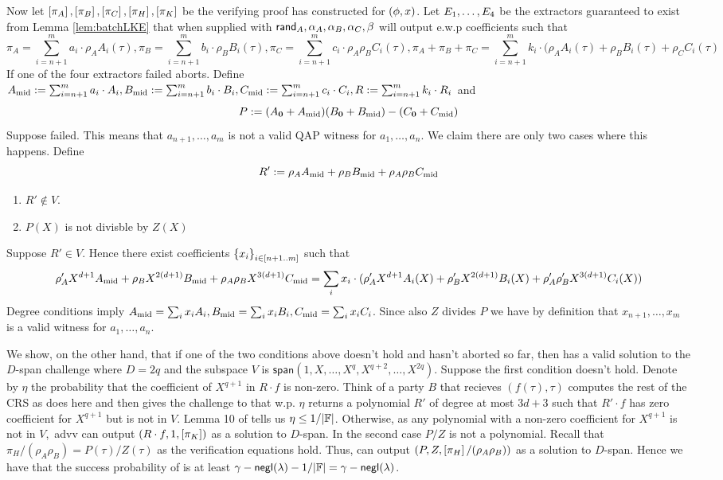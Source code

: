 \documentclass[11pt]{article}
\numberwithin{figure}{section} %
\newcommand{\set}[1]{\ensuremath{\left\{#1\right\}}\xspace}
\renewcommand{\span}{\ensuremath{\mathsf{span}}\xspace}
\begin{document}
 Now let $\left[\pi_A\right],\left[\pi_B\right],\left[\pi_C\right],\left[\pi_H\right],\left[\pi_K\right]$ be the verifying proof \adv has constructed
 for $(\phi,x)$.
 Let $E_1,\ldots,E_4$ be the extractors guaranteed to exist from Lemma \ref{lem:batchLKE}
 that when supplied with $\mathsf{rand}_{A},\alpha_A,\alpha_B,\alpha_C,\beta$ will output e.w.p \negl
 coefficients   such that
 \[\pi_A =\sum_{i= n+1}^m a_i\cdot \rho_A  A_i(\tau),\pi_B = \sum_{i= n+1}^m b_i\cdot \rho_B  B_i(\tau),
  \pi_C = \sum_{i= n+1}^m c_i\cdot \rho_A\rho_B  C_i(\tau), \pi_A+\pi_B+\pi_C = \sum_{i= n+1}^m k_i\cdot (\rho_A  A_i(\tau)+ \rho_B B_i(\tau) + \rho_C C_i(\tau)
 \]
If one of the four extractors failed \advv aborts.
Define $A_{\mathrm{mid}} := \sum_{i= n+1}^m a_i\cdot   A_i,B_{\mathrm{mid}} := \sum_{i= n+1}^m b_i\cdot B_i,
C_{\mathrm{mid}} := \sum_{i= n+1}^m c_i\cdot C_i, R:= \sum_{i= n+1}^m k_i\cdot R_i $
and 
\[P:= (A_{\mathrm{\mathbf{0}}}+A_{\mathrm{mid}})(B_{\mathrm{\mathbf{0}}}+B_{\mathrm{mid}})-(C_{\mathrm{\mathbf{0}}}+C_{\mathrm{mid}})\]
 Suppose \ext failed.
 This means that $a_{n+1},\ldots,a_m$ is not a valid QAP witness for $a_1,\ldots,a_n$.
We claim there are only two cases where this happens.
Define 
\[R':= \rho_A A_{\mathrm{mid}} + \rho_B B_{\mathrm{mid}} + \rho_A\rho_B C_{\mathrm{mid}}\]
\begin{enumerate}
 \item $R'\notin V$.
 \item $P(X)$ is not divisble by $Z(X)$
\end{enumerate}

Suppose $R'\in V$. Hence there exist coefficients $\sett{x_i}{i\in [n+1..m]}$ such that
\[\rho'_A X^{d+1} A_{\mathrm{mid}} + \rho_B X^{2(d+1)} B_{\mathrm{mid}} + \rho_A\rho_B X^{3(d+1)}C_{\mathrm{mid}} = \sum_i x_i\cdot (\rho'_A X^{d+1} A_i(X) + \rho'_BX^{2(d+1)} B_i(X) + \rho'_A\rho'_B X^{3(d+1)} C_i(X))\]
Degree conditions imply $A_{\mathrm{mid}} = \sum_i x_i A_i,B_{\mathrm{mid}} =\sum_i x_i B_i, C_{\mathrm{mid}} = \sum_i x_i C_i$.
Since also $Z$ divides $P$ we have by definition that $x_{n+1},\ldots,x_m$  is a valid witness for $a_1,\ldots,a_n$.

We show, on the other hand, that if one of the two conditions above doesn't hold and \advv hasn't aborted so far,
then \advv has a valid solution to the $D$-span challenge where $D=2q$ and the subspace $V$ is $\span(1,X,\ldots,X^q,X^{q+2},\ldots,X^{2q})$.
Suppose the first condition doesn't hold.
Denote by $\eta$ the probability that the coefficient of $X^{q+1}$ in $R\cdot f$ is non-zero.
Think of a party $B$ that recieves $(f(\tau),\tau)$ computes the rest of the CRS as \advv does here and then gives the challenge to \adv
that w.p. $\eta$ returns a polynomial $R'$ of degree at most $3d+3$ such that $R'\cdot f$ has zero coefficient for $X^{q+1}$ but is not in $V$.
Lemma 10 of \cite{GGPR} tells us $\eta\leq 1/|\mathbb F|$.
Otherwise, as any polynomial with a non-zero coefficient for $X^{q+1}$ is not in $V$,\ advv can output $(R\cdot f,1,\left[\pi_K\right])$ as a solution
to $D$-span.
In the second case $P/Z$ is not a polynomial. Recall that $\pi_H/(\rho_A\rho_B)=P(\tau)/Z(\tau)$ as the verification equations hold.
Thus, \advv can output $(P,Z,\left[\pi_H\right]/(\rho_A\rho_B))$ as a solution to $D$-span.                                                                
Hence we have that the success probability of \advv is at least $\gamma-\mathsf{negl}(\lambda)-1/|\mathbb F|=\gamma-\mathsf{negl}(\lambda)$.
 


\end{document}
